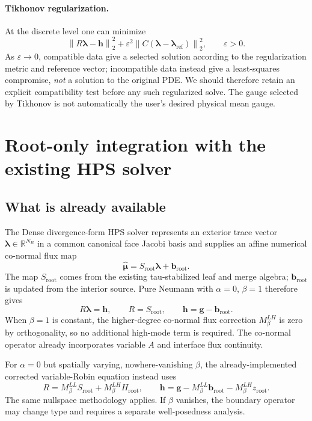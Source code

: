 \documentclass[11pt,letterpaper]{article}
\newcommand{\RR}{\mathbb R}
\newcommand{\norm}[1]{\left\lVert#1\right\rVert}
\newcommand{\lam}{\boldsymbol\lambda}
\newcommand{\qhat}{\widehat{\boldsymbol\mu}}
\newcommand{\bbroot}{\mathbf b_{\mathrm{root}}}
\newcommand{\rhs}{\mathbf h}
\begin{document}
\paragraph{Tikhonov regularization.}
At the discrete level one can minimize
\begin{equation}\label{eq:tikh}
 \norm{R\lam-\rhs}_2^2
 +\varepsilon^2\norm{C(\lam-\lam_{\mathrm{ref}})}_2^2,
 \qquad\varepsilon>0.
\end{equation}
As $\varepsilon\to0$, compatible data give a selected solution according
to the regularization metric and reference vector; incompatible data instead
give a least-squares compromise, \emph{not} a solution to the original PDE.
We should therefore retain an explicit compatibility test before any such
regularized solve. The gauge selected by Tikhonov is not automatically the
user's desired physical mean gauge.

\section{Root-only integration with the existing HPS solver}
\subsection{What is already available}
The Dense divergence-form HPS solver represents an exterior trace vector
$\lam\in\RR^{N_B}$ in a common canonical face Jacobi basis and supplies an
affine numerical co-normal flux map
\begin{equation}\label{eq:dtn}
 \qhat=S_{\mathrm{root}}\lam+\bbroot.
\end{equation}
The map $S_{\mathrm{root}}$ comes from the existing tau-stabilized leaf
and merge algebra; $\bbroot$ is updated from the interior source.
Pure Neumann with $\alpha=0$, $\beta=1$ therefore gives
\begin{equation}\label{eq:root}
 \boxed{R\lam=\rhs,\qquad
 R=S_{\mathrm{root}},\qquad \rhs=\mathbf g-\bbroot.}
\end{equation}
When $\beta=1$ is constant, the higher-degree co-normal flux correction
$M_\beta^{LH}$ is zero by orthogonality, so no additional high-mode term
is required. The co-normal operator already incorporates variable $A$ and
interface flux continuity.

For $\alpha=0$ but spatially varying, nowhere-vanishing $\beta$, the
already-implemented corrected variable-Robin equation instead uses
\begin{equation}\label{eq:variablebeta}
 R=M_\beta^{LL}S_{\mathrm{root}}+M_\beta^{LH}H_{\mathrm{root}},\qquad
 \rhs=\mathbf g-M_\beta^{LL}\bbroot-M_\beta^{LH}z_{\mathrm{root}}.
\end{equation}
The same nullspace methodology applies. If $\beta$ vanishes, the boundary
operator may change type and requires a separate well-posedness analysis.
\end{document}
